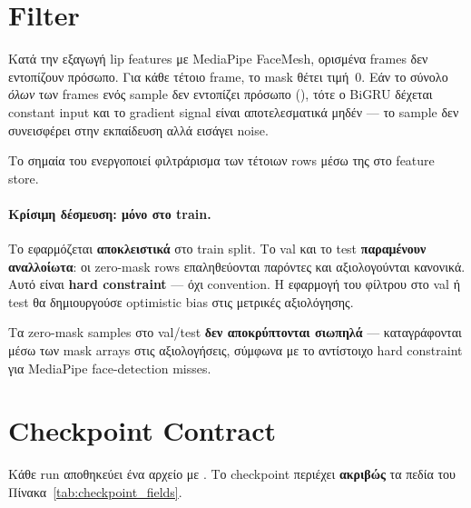 \section{ Filter}
\label{sec:drop-no-face}

Κατά την εξαγωγή lip features με MediaPipe FaceMesh,
ορισμένα frames δεν εντοπίζουν πρόσωπο.
Για κάθε τέτοιο frame, το mask θέτει τιμή~0.
Εάν το σύνολο \emph{όλων} των frames ενός sample
δεν εντοπίζει πρόσωπο (),
τότε ο BiGRU δέχεται constant input
και το gradient signal είναι αποτελεσματικά μηδέν —
το sample δεν συνεισφέρει στην εκπαίδευση
αλλά εισάγει noise.

Το σημαία  του 
ενεργοποιεί φιλτράρισμα των τέτοιων rows
μέσω της  στο feature store.

\paragraph{Κρίσιμη δέσμευση: μόνο στο train.}
Το  εφαρμόζεται \textbf{αποκλειστικά}
στο train split.
Το val και το test \textbf{παραμένουν αναλλοίωτα}:
οι zero-mask rows επαληθεύονται παρόντες
και αξιολογούνται κανονικά.
Αυτό είναι \textbf{hard constraint} —
όχι convention.
Η εφαρμογή του φίλτρου στο val ή test θα δημιουργούσε
optimistic bias στις μετρικές αξιολόγησης.

Τα zero-mask samples στο val/test
\textbf{δεν αποκρύπτονται σιωπηλά} —
καταγράφονται μέσω των mask arrays
στις αξιολογήσεις, σύμφωνα με το αντίστοιχο hard constraint
για MediaPipe face-detection misses.

\section{Checkpoint Contract}
\label{sec:checkpoint-contract}

Κάθε run αποθηκεύει ένα  αρχείο
με .
Το checkpoint περιέχει \textbf{ακριβώς} τα πεδία
του Πίνακα~\ref{tab:checkpoint_fields}.


